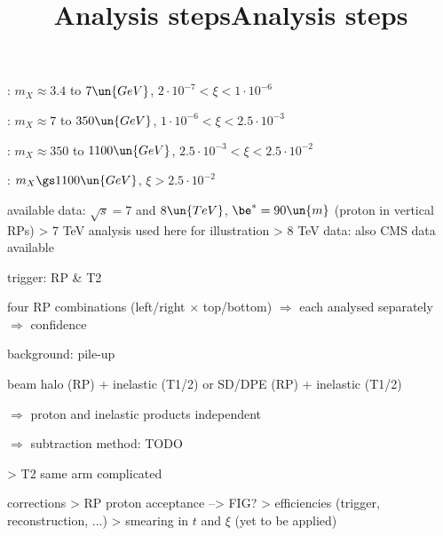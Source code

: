 \vskip-5mm

\> : $m_X \approx 3.4$ to $7\un{GeV}$, $2\cdot10^{-7} < \xi < 1\cdot 10^{-6}$


\> : $m_X \approx 7$ to $350\un{GeV}$, $1\cdot10^{-6} < \xi < 2.5\cdot 10^{-3}$


\> : $m_X \approx 350$ to $1100\un{GeV}$, $2.5\cdot10^{-3} < \xi < 2.5\cdot 10^{-2}$


\> : $m_X \gs 1100\un{GeV}$, $\xi > 2.5\cdot 10^{-2}$


\newpage %
\title{Analysis steps}

\> available data: $\sqrt s = 7$ and $8\un{TeV}$, $\be^* = 90\un{m}$ (proton in vertical RPs)
\>> 7 TeV analysis used here for illustration
\>> 8 TeV data: also CMS data available

\> trigger: RP \& T2

\> four RP combinations (left/right $\times$ top/bottom) $\Rightarrow$ each analysed separately $\Rightarrow$ confidence

\> background: pile-up

\centerline{beam halo (RP) + inelastic (T1/2) \hskip10mm or \hskip10mm SD/DPE (RP) + inelastic (T1/2)}

$\Rightarrow$ proton and inelastic products independent

$\Rightarrow$ subtraction method: TODO


\>> T2 same arm complicated

\newpage %
\title{Analysis steps}

\> corrections
\>> RP proton acceptance --> FIG?
\>> efficiencies (trigger, reconstruction, ...)
\>> smearing in $t$ and $\xi$ (yet to be applied)

